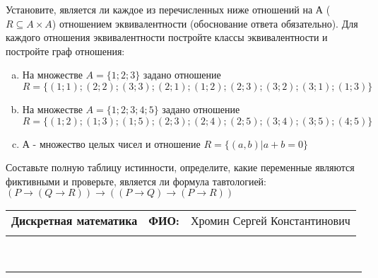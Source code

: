 \documentclass[10pt]{exam}
\newcommand{\class}{Дискретная математика}
\newcommand{\examdate}{}
\begin{document}
\begin{questions}
\question
Установите, является ли каждое из перечисленных ниже отношений на А ($R \subseteq A \times A$) отношением эквивалентности (обоснование ответа обязательно). Для каждого отношения эквивалентности постройте классы 
эквивалентности и постройте граф отношения:
\begin{enumerate} [a)]\setcounter{enumi}{0}
\item На множестве $A = \{1; 2; 3\}$ задано отношение $R = \{(1; 1); (2; 2); (3; 3); (2; 1); (1; 2); (2; 3); (3; 2); (3; 1); (1; 3)\}$
\item На множестве $A = \{1; 2; 3; 4; 5\}$ задано отношение $R = \{(1; 2); (1; 3); (1; 5); (2; 3); (2; 4); (2; 5); (3; 4); (3; 5); (4; 5)\}$
\item А - множество целых чисел и отношение $R = \{(a,b)|a + b = 0\}$
\end{enumerate}\question Составьте полную таблицу истинности, определите, какие переменные являются фиктивными и проверьте, является ли формула тавтологией:
$(P \rightarrow (Q \rightarrow R)) \rightarrow ((P \rightarrow Q) \rightarrow (P \rightarrow R))$

\end{questions}
\newpage
\begin{flushright}
\begin{tabular}{p{2.8in} r l}
\textbf{\class} & \textbf{ФИО:} &Хромин Сергей Константинович
\\

\textbf{\examdate} &&\\
\end{tabular}\\
\end{flushright}
\rule[1ex]{\textwidth}{.1pt}
\end{document}
